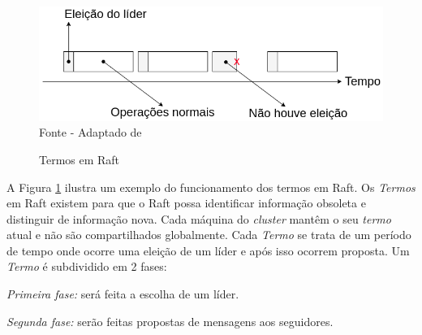 \begin{figure}[htb!]
\centering
\caption{Termos em Raft}
\includegraphics[width=0.8\linewidth]{figures/terms-raft.drawio.png}
{\flushleft Fonte - Adaptado de \textcite{raft}}
\label{fig:terms-raft}
\end{figure}

A Figura \ref{fig:terms-raft} ilustra um exemplo do funcionamento dos termos em Raft. Os \textit{Termos} em Raft existem para que o Raft possa identificar informação obsoleta e distinguir de informação nova. Cada máquina do \textit{cluster} mantêm o seu \textit{termo} atual e não são compartilhados globalmente. Cada \textit{Termo} se trata de um período de tempo onde ocorre uma eleição de um líder e após isso ocorrem proposta. Um \textit{Termo} é subdividido em 2 fases:

\textit{Primeira fase:} será feita a escolha de um líder.

\textit{Segunda fase:} serão feitas propostas de mensagens aos seguidores.





